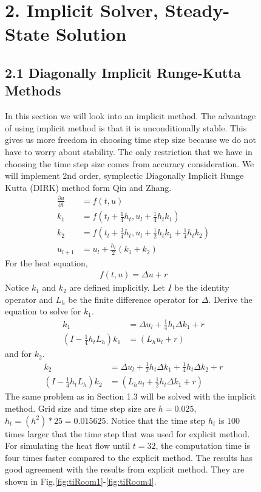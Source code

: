 \documentclass[11pt, letterpaper, hidelinks]{article}
\theoremstyle{definition}
\begin{document}
\begin{figure}[H]
\section{2. Implicit Solver, Steady-State Solution}
\subsection{2.1 Diagonally Implicit Runge-Kutta Methods}
In this section we will look into an implicit method. The advantage of using implicit method is that it is unconditionally stable. This gives us more freedom in choosing time step size because we do not have to worry about stability. The only restriction that we have in choosing the time step size comes from accuracy consideration. We will implement 2nd order, symplectic Diagonally Implicit Runge Kutta (DIRK) method form Qin and Zhang.
\begin{align*}
    \frac{\partial u}{\partial t} & = f(t,u)                                                                             \\
    k_1                           & = f\left( t_l+\frac{1}{4}h_t , u_l + \frac{1}{4}h_t k_1 \right)                      \\
    k_2                           & = f\left( t_l+\frac{3}{4}h_t , u_l + \frac{1}{2}h_t k_1 + \frac{1}{4}h_t k_2 \right) \\
    u_{l+1}                       & = u_l + \frac{h_t}{2} \left(k_1+k_2\right)
\end{align*}
For the heat equation,
\begin{align*}
    f(t,u) = \Delta u + r
\end{align*}
Notice $k_1$ and $k_2$ are defined implicitly. Let $I$ be the identity operator and $L_h$ be the finite difference operator for $\Delta$. Derive the equation to solve for $k_1$.
\begin{align*}
    k_1                                    & = \Delta u_l + \frac{1}{4}h_t \Delta k_1 + r \\
    \left(I-\frac{1}{4}h_t L_h \right) k_1 & = \left(L_h u_l + r\right)
\end{align*}
and for $k_2$.
\begin{align*}
    k_2                                    & = \Delta u_l + \frac{1}{2}h_t \Delta k_1 + \frac{1}{4}h_t \Delta k_2 + r \\
    \left(I-\frac{1}{4}h_t L_h \right) k_2 & = \left(L_h u_l + \frac{1}{2}h_t \Delta k_1 + r\right)
\end{align*}
The same problem as in Section 1.3 will be solved with the implicit method. Grid size and time step size are $h=0.025$, $h_t=(h^2)*25=0.015625$. Notice that the time step $h_t$ is $100$ times larger that the time step that was used for explicit method. For simulating the heat flow until $t=32$, the computation time is four times faster compared to the explicit method. The results has good agreement with the results from explicit method. They are shown in Fig.\ref{fig:tiRoom1}-\ref{fig:tiRoom4}.

\end{figure}
\end{document}
